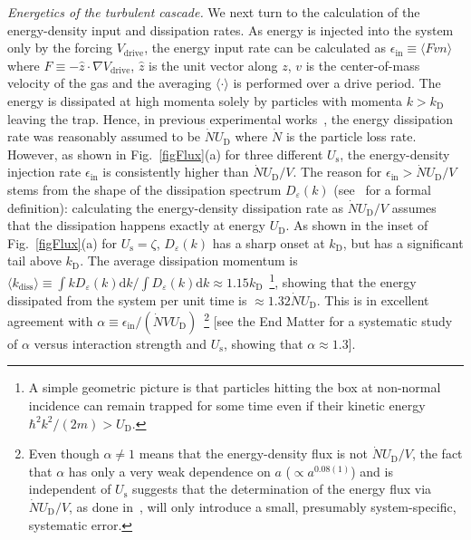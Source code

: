 \documentclass[prl,aps,twocolumn, a4paper,longbibliography,superscriptaddress]{revtex4-2}
\newcommand{\kD}{k_{\textrm{D}}}
\newcommand{\UD}{U_{\textrm{D}}}
\newcommand{\Us}{U_{\textrm{s}}}
\newcommand{\Ein}{\epsilon_{\textrm{in}}}
\begin{document}
\textit{Energetics of the turbulent cascade.} We next turn to the calculation of the energy-density input and dissipation rates. As energy is injected into the system only by the forcing $V_\text{drive}$, the energy input rate can be calculated as $\Ein\equiv\langle Fvn\rangle$ where $F\equiv-\hat{z}\cdot \nabla V_\text{drive}$, $\hat{z}$ is the unit vector along $z$, $v$ is the center-of-mass velocity of the gas and the averaging $\langle\cdot\rangle$ is performed over a drive period. The energy is dissipated at high momenta solely by particles with momenta $k>\kD$ leaving the trap. Hence, in previous experimental works~\cite{Navon:2019,Dogra:2023}, the energy dissipation rate was reasonably assumed to be $\dot{N}\UD$ where $\dot{N}$ is the particle loss rate. However, as shown in Fig.~\ref{figFlux}(a) for three different $\Us$, the energy-density injection rate $\Ein$ is consistently higher than $\dot{N}\UD/V$.
The reason for $\Ein>\dot{N}\UD/V$ stems from the shape of the dissipation spectrum $D_\varepsilon(k)$ (see~\cite{Supplementary} for a formal definition): calculating the energy-density dissipation rate as $\dot{N}\UD/V$ assumes that the dissipation happens exactly at energy $\UD$. As shown in the inset of Fig.~\ref{figFlux}(a) for $\Us=\zeta$, $D_\varepsilon(k)$ has a sharp onset at $\kD$, but has a significant tail above $\kD$. The average dissipation momentum is $\langle k_{\textrm{diss}}\rangle\equiv\int k D_\varepsilon(k)\textrm{d}k/\int D_\varepsilon(k) \textrm{d}k \approx1.15\kD$~\footnote{A simple geometric picture is that particles hitting the box at non-normal incidence can remain trapped for some time even if their kinetic energy $\hbar^2 k^2/(2m)>\UD$.}, showing that the energy dissipated from the system per unit time is $\approx 1.32\dot{N}\UD$. This is in excellent agreement with $
\alpha\equiv\Ein/(\dot{N}V\UD)$~\footnote{Even though $\alpha\neq 1$ means that the energy-density flux is not $\dot{N} \UD/V$, the fact that $\alpha$ has only a very weak dependence on $a$ ($\propto a^{0.08(1)}$) and is independent of $\Us$ suggests that the determination of the energy flux via $\dot{N} \UD/V$, as done in~\cite{Navon:2019,Dogra:2023}, will only introduce a small, presumably system-specific, systematic error.} [see the End Matter for a systematic study of $\alpha$ versus interaction strength and $\Us$, showing that $\alpha\approx1.3$].
\end{document}
